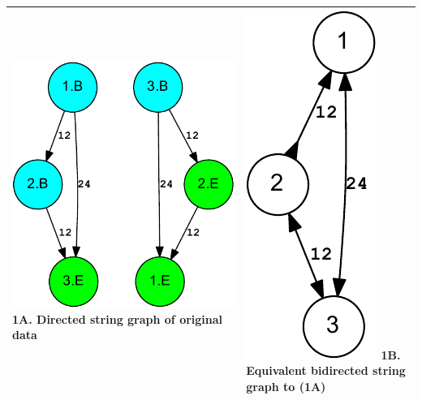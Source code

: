 \documentclass[letterpaper,12pt]{article}
\begin{document}
\newpage
\begin{tabular}{|p{}|p{}|} \hline
\centering
\includegraphics[scale=0.6]{out.digraph-crop.pdf}
\newline 1A. Directed string graph of original data
&
\centering
\includegraphics[scale=0.7]{out.bidigraph-crop.pdf}
\newline 1B. Equivalent bidirected string graph to (1A)
\tabularnewline \hline


\end{tabular}
\end{document}
